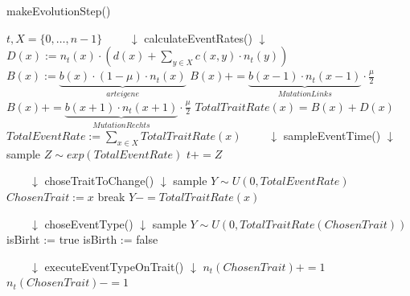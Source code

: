 \documentclass[11pt, a4paper, german]{article}
\theoremstyle{plain}
\begin{document}
	\begin{algorithm}[H]
		\caption{makeEvolutionStep()}
		\begin{algorithmic}[1]
			\REQUIRE $ t, X = \{0,\dots, n-1\} $
			\STATE $ \qquad \downarrow $ \textcolor[rgb]{0,0,0.55}{calculateEventRates}() $ \downarrow $
				\STATE $  D(x) := n_t(x) \cdot \left( d(x) + \sum_{y \in X} c(x,y) \cdot n_t(y) \right) $
				\STATE $ B(x) := \underbrace{b(x) \cdot (1 - \mu) \cdot n_t(x)}_{arteigene}  $
					\STATE $ B(x) += \underbrace{b(x-1)\cdot n_t(x-1)}_{Mutation Links} \cdot \frac{\mu}{2} $
				\ENDIF
					\STATE $ B(x) += \underbrace{b(x+1)\cdot n_t(x+1)}_{Mutation Rechts} \cdot \frac{\mu}{2} $
				\ENDIF
				\STATE $ TotalTraitRate(x) = B(x) + D(x) $
			\ENDFOR
			\STATE $ TotalEventRate := \sum_{x \in X} TotalTraitRate(x) $
			\STATE $ \qquad \downarrow $ \textcolor[rgb]{0,0,0.55}{sampleEventTime}() $ \downarrow $
			\STATE sample $ Z \sim exp(TotalEventRate) $
			\STATE $ t += Z $
			
			\STATE $ \qquad \downarrow $ \textcolor[rgb]{0,0,0.55}{choseTraitToChange}() $ \downarrow $
			\STATE sample $ Y \sim U(0,TotalEventRate) $
					\STATE $ ChosenTrait := x $
					\STATE break
				\ENDIF
				\STATE $ Y -= TotalTraitRate(x) $
			\ENDFOR
			
			\STATE $ \qquad \downarrow $ \textcolor[rgb]{0,0,0.55}{choseEventType()} $ \downarrow $
			\STATE sample $ Y \sim U(0,TotalTraitRate(ChosenTrait)) $
				\STATE isBirht := true
			\ELSE
				\STATE isBirth := false
			\ENDIF
			
			\STATE $ \qquad \downarrow $ \textcolor[rgb]{0,0,0.55}{executeEventTypeOnTrait()} $ \downarrow $
				\STATE $ n_t(ChosenTrait) += 1 $
			\ELSE
					\STATE $ n_t(ChosenTrait) -= 1 $
				\ENDIF
			\ENDIF
		\end{algorithmic}
	\end{algorithm}
	
\end{document}
